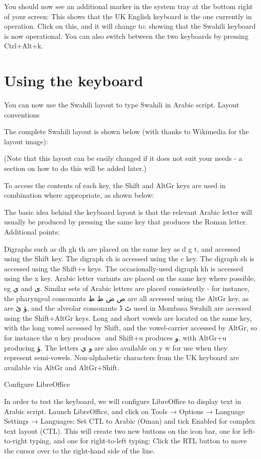 \documentclass[a4paper,10pt]{article}
\begin{document}
You should now see an additional marker in the system tray at the bottom right of your screen:
This shows that the UK English keyboard is the one currently in operation. Click on this, and it will change to:
showing that the Swahili keyboard is now operational. You can also switch between the two keyboards by pressing Ctrl+Alt+k.


\section{Using the keyboard}

You can now use the Swahili layout to type Swahili in Arabic script.
Layout conventions

The complete Swahili layout is shown below (with thanks to Wikimedia for the layout image):

(Note that this layout can be easily changed if it does not suit your needs - a section on how to do this will be added later.)

To access the contents of each key, the Shift and AltGr keys are used in combination where appropriate, as shown below:

The basic idea behind the keyboard layout is that the relevant Arabic letter will usually be produced by pressing the same key that produces the Roman letter. Additional points:

    Digraphs such as dh gh th are placed on the same key as d g t, and accessed using the Shift key.
    The digraph ch is accessed using the c key.
    The digraph sh is accessed using the Shift+s keys.
    The occasionally-used digraph kh is accessed using the x key.
    Arabic letter variants are placed on the same key where possible, eg ي and ى.
    Similar sets of Arabic letters are placed consistently - for instance, the pharyngeal consonants ص ض ط ظ are all accessed using the AltGr key, as are ؤ ئ, and the alveolar consonants ٹ ڈ used in Mombasa Swahili are accessed using the Shift+AltGr keys.
    Long and short vowels are located on the same key, with the long vowel accessed by Shift, and the vowel-carrier accessed by AltGr, so for instance the u key produces ُ and Shift+u produces و, with AltGr+u producing ؤ.
    The letters و ي are also available on y w for use when they represent semi-vowels.
    Non-alphabetic characters from the UK keyboard are available via AltGr and AltGr+Shift.

Configure LibreOffice

In order to test the keyboard, we will configure LibreOffice to display text in Arabic script. Launch LibreOffice, and click on Tools → Options → Language Settings → Languages:
Set CTL to Arabic (Oman) and tick Enabled for complex text layout (CTL). This will create two new buttons on the icon bar, one for left-to-right typing, and one for right-to-left typing:
Click the RTL button to move the cursor over to the right-hand side of the line.
\end{document}
